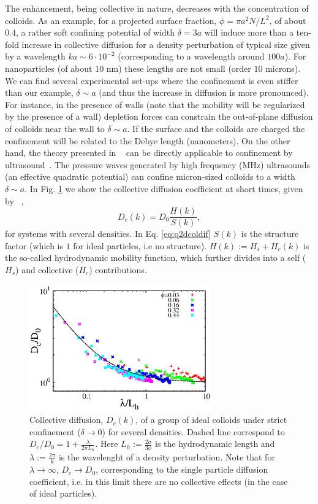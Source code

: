 \documentclass[twoside,openright,titlepage,numbers=noenddot,%
headinclude,footinclude,cleardoublepage=empty,abstract=on,
BCOR=5mm,fontsize=11pt, dvipsnames, paper=b5
]{scrreprt}
\begin{document}
The enhancement, being collective in nature, decreases with the concentration of colloids. As an example, for a projected surface fraction, $\phi = \pi a^2N/L^2$, of about $0.4$, a rather soft confining potential of width $\delta = 3a$ will induce more than a ten-fold increase in collective diffusion for a density perturbation of typical size given by a wavelength $ka \sim 6\cdot 10^{-2}$ (corresponding to a wavelength around $100a$). For nanoparticles (of about $10$ nm) these lengths are not small (order $10$ microns). We can find several experimental set-ups where the confinement is even stiffer than our example, $\delta\sim a$ (and thus the increase in diffusion is more pronounced). For instance, in the presence of walls (note that the mobility will be regularized by the presence of a wall) depletion forces can constrain the out-of-plane diffusion of colloids near the wall to $\delta\sim a$. If the surface and the colloids are charged the confinement will be related to the Debye length (nanometers). On the other hand, the theory presented in ~\cite{Pelaez2017} can be directly applicable to confinement by ultrasound~\cite{Balboa2013}. The pressure waves generated by high frequency (MHz) ultrasounds (an effective quadratic potential) can confine micron-sized colloids to a width $\delta \sim a$.
In Fig. \ref{fig:q2DEnhancement} we show the collective diffusion coefficient at short times, given by ~\cite{Dhont1996},
\begin{equation}
  \label{eq:q2dcoldif}
  D_c(k) = D_0\frac{H(k)}{S(k)},
\end{equation}
for systems with several densities.
In Eq. \eqref{eq:q2dcoldif} $S(k)$ is the structure factor (which is $1$ for ideal particles, i.e no structure). $H(k):= H_s + H_c(k)$ is the so-called hydrodynamic mobility function, which further divides into a self ($H_s$) and collective ($H_c$) contributions.
\begin{figure}[H]
  \centering
  \includegraphics[width=0.7\textwidth]{gfx/q2DEnhancement}
  \caption[ ]{Collective diffusion, $D_c(k)$, of a group of ideal colloids under strict confinement ($\delta\rightarrow 0$) for several densities. Dashed line correspond to $D_c/D_0 = 1 + \frac{\lambda}{2\pi L_h}$. Here $L_h := \frac{2a}{3\phi}$ is the hydrodynamic length and $\lambda := \frac{2\pi}{k}$ is the wavelenght of a density perturbation. Note that for $\lambda \rightarrow \infty$, $D_c\rightarrow D_0$, corresponding to the single particle diffusion coefficient, i.e. in this limit there are no collective effects (in the case of ideal particles).}
  \label{fig:q2DEnhancement}
\end{figure}
\end{document}
